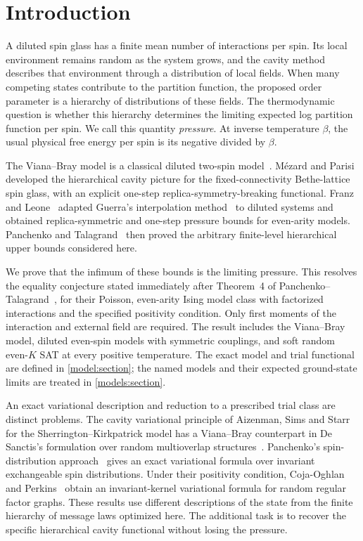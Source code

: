 \section{Introduction}

A diluted spin glass has a finite mean number of interactions per spin.
Its local environment remains random as the system grows, and the cavity
method describes that environment through a distribution of local fields.
When many competing states contribute to the partition function, the
proposed order parameter is a hierarchy of distributions of these fields.
The thermodynamic question is whether this hierarchy determines the
limiting expected log partition function per spin. We call this quantity
\emph{pressure}. At inverse temperature $\beta$, the usual physical free
energy per spin is its negative divided by $\beta$.

The Viana--Bray model is a classical diluted two-spin
model~\cite{VB85}. M\'ezard and Parisi~\cite{MP01} developed the
hierarchical cavity picture for the fixed-connectivity Bethe-lattice
spin glass, with an explicit one-step replica-symmetry-breaking
functional. Franz and Leone~\cite{FL03} adapted Guerra's
interpolation method~\cite{Guerra03} to diluted systems and obtained
replica-symmetric and one-step pressure bounds for even-arity models.
Panchenko and
Talagrand~\cite{PT04} then proved the arbitrary finite-level
hierarchical upper bounds considered here.

We prove that the infimum of these bounds is the limiting pressure.
This resolves the equality conjecture stated immediately after
Theorem~4 of Panchenko--Talagrand~\cite{PT04}, for their Poisson,
even-arity Ising model class with factorized interactions and the
specified positivity condition. Only first moments of the interaction
and external field are required. The result includes the Viana--Bray
model, diluted even-spin models with symmetric couplings, and soft
random even-$K$ SAT at every positive temperature. The exact model and
trial functional are defined in \cref{model:section}; the named models
and their expected ground-state limits are treated in
\cref{models:section}.

An exact variational description and reduction to a prescribed
trial class are distinct problems. The cavity variational principle of
Aizenman, Sims and Starr~\cite{ASS03} for the Sherrington--Kirkpatrick model
has a Viana--Bray counterpart in De Sanctis's formulation over random
multioverlap structures~\cite{DeSanctis04}. Panchenko's
spin-distribution approach~\cite[Theorems~1--2]{Pan13} gives an exact
variational formula over invariant exchangeable spin distributions.
Under their positivity condition, Coja-Oghlan and
Perkins~\cite{COP19} obtain an invariant-kernel variational formula
for random regular factor graphs. These results
use different descriptions of the state from the finite hierarchy of
message laws optimized here. The additional task is to recover the
specific hierarchical cavity functional without losing the pressure.

